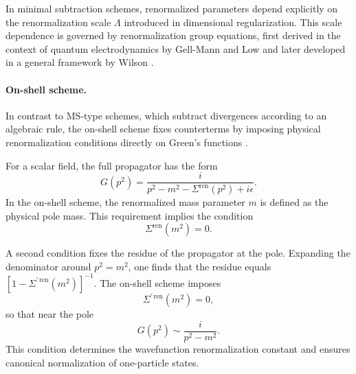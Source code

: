 In minimal subtraction schemes, renormalized parameters depend
explicitly on the renormalization scale $\Lambda$ introduced in
dimensional regularization.
This scale dependence is governed by renormalization group equations,
first derived in the context of quantum electrodynamics by
Gell-Mann and Low \cite{GellMannLow1954} and later developed in
a general framework by Wilson \cite{Wilson1971}.

\paragraph{On-shell scheme.}

In contrast to MS-type schemes, which subtract divergences according
to an algebraic rule, the on-shell scheme fixes counterterms by
imposing physical renormalization conditions directly on Green’s
functions \cite{Dyson1949,PeskinSchroeder1995,WeinbergQFT}.

For a scalar field, the full propagator has the form
\begin{equation}
G(p^2)
=
\frac{i}{p^2 - m^2 - \Sigma^{\mathrm{ren}}(p^2) + i\epsilon}.
\end{equation}
In the on-shell scheme, the renormalized mass parameter $m$ is defined
as the physical pole mass.
This requirement implies the condition
\begin{equation}
\Sigma^{\mathrm{ren}}(m^2) = 0.
\label{eq:OS_mass_scheme}
\end{equation}

A second condition fixes the residue of the propagator at the pole.
Expanding the denominator around $p^2 = m^2$,
one finds that the residue equals
\(
\left[1 - \Sigma^{\prime\,\mathrm{ren}}(m^2)\right]^{-1}.
\)
The on-shell scheme imposes
\begin{equation}
\Sigma^{\prime\,\mathrm{ren}}(m^2) = 0,
\label{eq:OS_residue_scheme}
\end{equation}
so that near the pole
\begin{equation}
G(p^2) \sim \frac{i}{p^2 - m^2}.
\end{equation}
This condition determines the wavefunction renormalization constant
and ensures canonical normalization of one-particle states.

